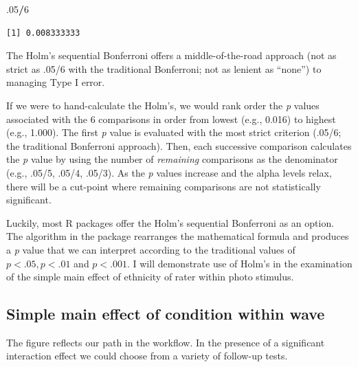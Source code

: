 \documentclass[
  11pt,
]{book}
\newenvironment{Shaded}{\begin{snugshade}}{\end{snugshade}}
\newcommand{\DecValTok}[1]{\textcolor[rgb]{0.06,0.06,0.06}{#1}}
\newcommand{\NormalTok}[1]{#1}
\newcommand{\SpecialCharTok}[1]{\textcolor[rgb]{0.43,0.43,0.43}{\textbf{#1}}}
\begin{document}
\begin{Shaded}
\begin{Highlighting}[]
\NormalTok{.}\DecValTok{05}\SpecialCharTok{/}\DecValTok{6}
\end{Highlighting}
\end{Shaded}

\begin{verbatim}
[1] 0.008333333
\end{verbatim}

The Holm's sequential Bonferroni \citep{green_using_2017} offers a middle-of-the-road approach (not as strict as .05/6 with the traditional Bonferroni; not as lenient as ``none'') to managing Type I error.

If we were to hand-calculate the Holm's, we would rank order the \emph{p} values associated with the 6 comparisons in order from lowest (e.g., 0.016) to highest (e.g., 1.000). The first \emph{p} value is evaluated with the most strict criterion (.05/6; the traditional Bonferroni approach). Then, each successive comparison calculates the \emph{p} value by using the number of \emph{remaining} comparisons as the denominator (e.g., .05/5, .05/4, .05/3). As the \emph{p} values increase and the alpha levels relax, there will be a cut-point where remaining comparisons are not statistically significant.

Luckily, most R packages offer the Holm's sequential Bonferroni as an option. The algorithm in the package rearranges the mathematical formula and produces a \emph{p} value that we can interpret according to the traditional values of \(p < .05, p < .01\) and \(p < .001\). I will demonstrate use of Holm's in the examination of the simple main effect of ethnicity of rater within photo stimulus.

\hypertarget{simple-main-effect-of-condition-within-wave}{%
\subsection{Simple main effect of condition within wave}\label{simple-main-effect-of-condition-within-wave}}

The figure reflects our path in the workflow. In the presence of a significant interaction effect we could choose from a variety of follow-up tests.
\end{document}
